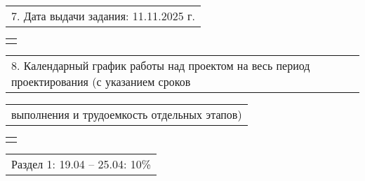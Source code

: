 \documentclass[12pt, А4, twoside]{article}
\begin{document}
\begin{FlushLeft}
    \vspace{-0.1 cm}

    \begin{tabular}{p{17.25cm}}
        \textsf{7. Дата выдачи задания: 11.11.2025 г.} \vspace{0pt} \hline \\
    \end{tabular}

    \begin{tabular}{p{17.25cm}}
        \vspace{0pt} \hline \\
    \end{tabular}

    \vspace{-0.1 cm}

    \begin{tabular}{p{17.25cm}}
        \textsf{8. Календарный график работы над проектом на весь период проектирования (с указанием сроков} \vspace{0pt} \hline \\
    \end{tabular}

    \vspace{-0.1 cm}

    \begin{tabular}{p{17.25cm}}
        \textsf{выполнения и трудоемкость отдельных этапов)} \vspace{0pt} \hline \\
    \end{tabular}

    \begin{tabular}{p{17.25cm}}
        \vspace{0pt} \hline \\
    \end{tabular}

    \vspace{-0.1 cm}

    \begin{tabular}{p{17.25cm}}
        \hspace{0.3cm} \textsf{Раздел 1:} \hspace{2.54cm} \textsf{ 19.04 {--} 25.04:} \hspace{0.5cm} \textsf{10\%} \vspace{0pt} \hline \\
    \end{tabular}

    \vspace{-0.1 cm}


\end{FlushLeft}
\end{document}
